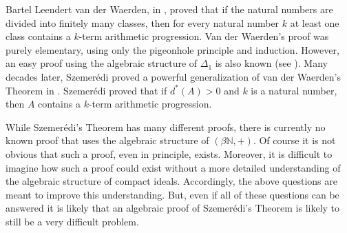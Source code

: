 \documentclass[12pt]{article}
\theoremstyle{plain}
\theoremstyle{definition}
\newcommand{\bbN}{\mathbb{N}}
\begin{document}
Bartel Leendert van der Waerden, in \cite{Van-der-Waerden:1927fk},
proved that if the natural numbers are divided into finitely many
classes, then for every natural number $k$ at least one class contains
a $k$-term arithmetic progression.
Van der Waerden's proof was purely elementary, using only the
pigeonhole principle and induction. 
However, an easy proof using the algebraic structure of $\Delta_1$ is
also known (see \cite[Theorem 14.1 and Corollary 14.2]{Hindman:1998fk}).
Many decades later, Szemer\'{e}di proved a powerful generalization of van
der Waerden's Theorem in \cite{Szemeredi:1975uq}.
Szemer\'{e}di proved that if $d^*(A) > 0$ and $k$ is a natural number,
then $A$ contains a $k$-term arithmetic progression.

While Szemer\'{e}di's Theorem has many different proofs, there is
currently no known proof that uses the algebraic structure of
$(\beta\bbN,+)$. 
Of course it is not obvious that such a proof, even in principle,
exists.
Moreover, it is difficult to imagine how such a proof could exist
without a more detailed understanding of the algebraic structure of
compact ideals. 
Accordingly, the above questions are meant to improve this understanding.
But, even if all of these questions can be answered it is likely that
an algebraic proof of Szemer\'{e}di's Theorem is likely to still be a
very difficult problem. 
\end{document}
